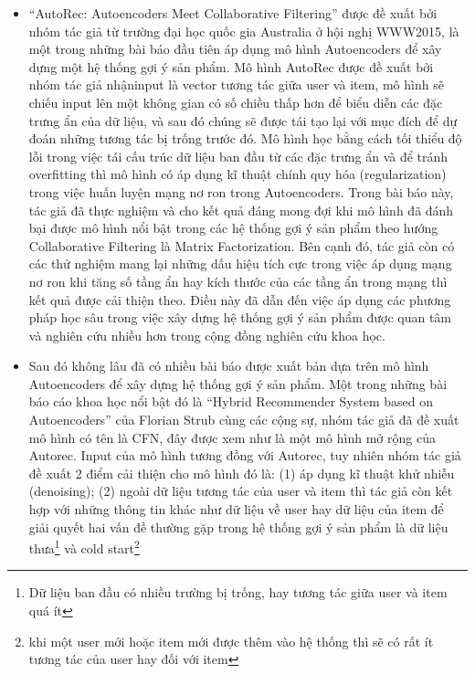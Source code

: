 \documentclass{article}[14pt]
\begin{document}
{\begin{itemize}
   \item   “AutoRec: Autoencoders Meet Collaborative Filtering”\cite{autorec} được đề xuất bởi 
   nhóm tác giả từ trường đại học quốc gia Australia  ở hội nghị WWW2015, là một 
   trong những bài báo đầu tiên áp dụng mô hình Autoencoders để xây dựng một hệ 
   thống gợi ý sản phẩm. Mô hình AutoRec được đề xuất bởi nhóm tác giả nhậninput 
   là vector tương tác giữa user và item, mô hình sẽ chiếu input lên một không 
   gian có số chiều thấp hơn để biểu diễn các đặc trưng ẩn của dữ liệu, và sau 
   đó chúng sẽ được tái tạo lại với mục đích để dự đoán những tương tác bị 
   trống trước đó. Mô hình học bằng cách tối thiểu độ lỗi trong việc tái cấu 
   trúc dữ liệu ban đầu từ các đặc trưng ẩn và để tránh overfitting thì mô hình 
   có áp dụng kĩ thuật chính quy hóa (regularization) trong việc huấn luyện mạng 
   nơ ron trong Autoencoders. Trong bài báo này, tác giả đã thực nghiệm và cho 
   kết quả đáng mong đợi khi mô hình đã đánh bại được mô hình nổi bật trong các 
   hệ thống gợi ý sản phẩm theo hướng Collaborative Filtering là Matrix 
   Factorization. Bên cạnh đó, tác giả còn có các thử nghiệm mang lại những dấu 
   hiệu tích cực trong việc áp dụng mạng nơ ron khi tăng số tầng ẩn hay kích 
   thước của các tầng ẩn trong mạng thì kết quả được cải thiện theo. Điều này đã 
   dẫn đến việc áp dụng các phương pháp học sâu trong việc xây dựng hệ thống gợi 
   ý sản phẩm được quan tâm và nghiên cứu nhiều hơn trong cộng đồng nghiên cứu 
   khoa học.
   \item Sau đó không lâu đã có nhiều bài báo được xuất bản dựa trên mô hình 
   Autoencoders để xây dựng hệ thống gợi ý sản phẩm. Một trong những bài báo cáo 
   khoa học nổi bật đó là “Hybrid Recommender System based on Autoencoders” 
   \cite{cfn} của Florian Strub cùng các cộng sự, nhóm tác giả đã đề xuất mô 
   hình có tên là CFN, đây được xem như là một mô hình mở rộng của Autorec. 
   Input của mô hình tương đồng với Autorec, tuy nhiên nhóm tác giả đề xuất 2 
   điểm cải thiện cho mô hình đó là: (1) áp dụng kĩ thuật khử nhiễu 
   (denoising); (2) ngoài dữ liệu tương tác của user và item thì tác giả còn 
   kết hợp với những thông tin khác như dữ liệu về user hay dữ liệu của item để 
   giải quyết hai vấn đề thường gặp trong hệ thống gợi ý sản phẩm là dữ liệu 
   thưa\footnote{Dữ liệu ban đầu có nhiều trường bị trống, hay tương tác giữa 
   user và item quá ít} và cold start\footnote{khi một user mới hoặc item mới 
   được thêm vào hệ thống thì sẽ có rất ít tương tác của user hay đối với item 
}
\end{itemize}}
\end{document}

